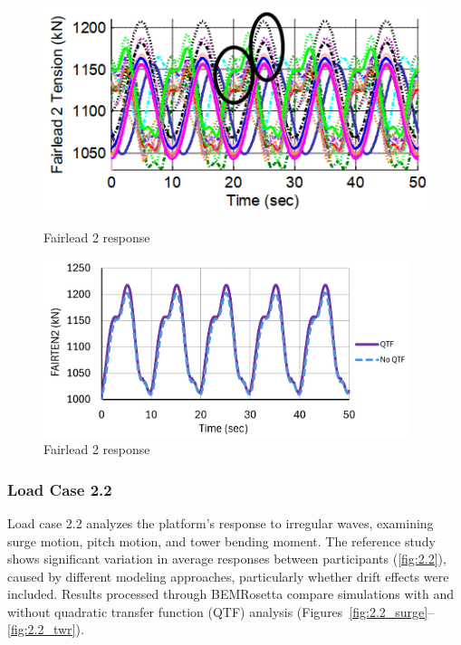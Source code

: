 \documentclass[a4paper, 11pt]{article}
\begin{document}
\begin{figure}[H]
    \begin{minipage}{0.48\textwidth}
        \centering
        \includegraphics[width=1\textwidth]{2.1_fairten2.png}
        \caption{\small Fairlead 2 response \cite{Robertson2014}}
        \label{fig:2.1_fairten2}
    \end{minipage}
    \hfill
    \begin{minipage}{0.51\textwidth}
        \centering
        \includegraphics[width=0.95\textwidth]{2.1_fairten2_mine.png}
        \caption{\small Fairlead 2 response}
        \label{fig:2.1_fairten2_mine}
    \end{minipage}
\end{figure}

\subsubsection{Load Case 2.2}

\hspace{0.5cm}Load case 2.2 analyzes the platform's response to irregular waves, examining surge motion, pitch motion, and tower bending moment. The reference study shows significant variation in average responses between participants (\autoref{fig:2.2}), caused by different modeling approaches, particularly whether drift effects were included. Results processed through BEMRosetta compare simulations with and without quadratic transfer function (QTF) analysis (Figures~\ref{fig:2.2_surge}--\ref{fig:2.2_twr}). 
\end{document}
